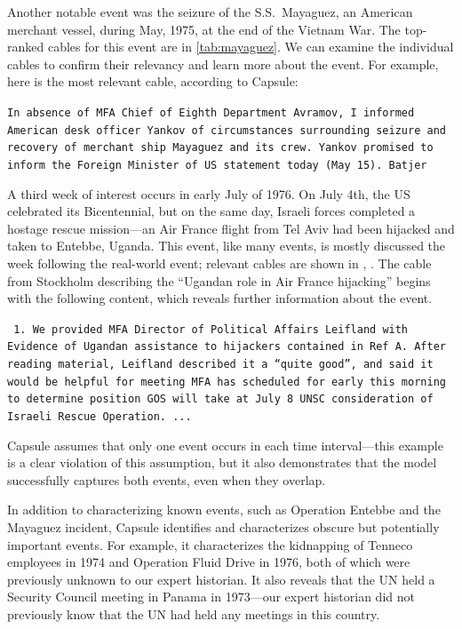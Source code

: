 Another notable event was the seizure of the S.S.~Mayaguez, an
American merchant vessel, during May, 1975, at the end of the Vietnam
War. The top-ranked cables for this event are in
\cref{tab:mayaguez}. We can examine the individual cables to confirm
their relevancy and learn more about the event. For example, here is
the most relevant cable, according to Capsule:
\begin{shaded*} \tt{In absence of MFA Chief of Eighth Department Avramov, I
informed American desk officer Yankov of circumstances surrounding seizure
and recovery of merchant ship Mayaguez and its crew.  Yankov promised to
inform the Foreign Minister of US statement today  (May 15).
Batjer
}
\end{shaded*}


A third week of interest occurs in early July of 1976.  On July 4th, the US celebrated its Bicentennial, but on the same day, Israeli forces completed a hostage rescue mission---an Air France flight from Tel Aviv had been hijacked and taken to Entebbe, Uganda.  This event, like many events, is mostly discussed the week following the real-world event; relevant cables are shown in , .
The cable from Stockholm describing the ``Ugandan role in Air France hijacking'' begins with the following content, which reveals further information about the event.
\begin{shaded*} \tt{
1. We provided MFA Director of Political Affairs
Leifland with Evidence of Ugandan assistance to
hijackers contained in Ref A.  After reading material,{}
Leifland described it a ``quite good'', and said it{}
would be helpful for meeting MFA has scheduled for
early this morning to determine position GOS will take
at July 8 UNSC consideration of Israeli Rescue Operation. ...
}
\end{shaded*}
Capsule assumes that only one event occurs in each time interval---this example is a clear violation of this assumption, but it also demonstrates that the model successfully captures both events, even when they overlap.

In addition to characterizing known events, such as Operation Entebbe and the Mayaguez incident, Capsule identifies and characterizes obscure but potentially important events.  For example, it characterizes the kidnapping of Tenneco employees in 1974 and Operation Fluid Drive in 1976, both of which were previously unknown to our expert historian.  It also reveals that the UN held a Security Council meeting in Panama in 1973---our expert historian did not previously know that the UN had held any meetings in this country.

